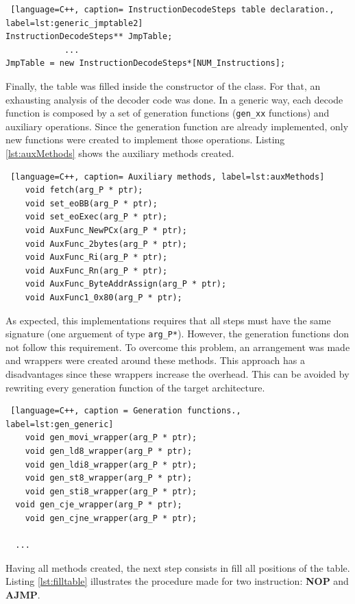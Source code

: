 \documentclass[12pt]{article}
\begin{document}
{\begin{lstlisting} [language=C++, caption= InstructionDecodeSteps table declaration., label=lst:generic_jmptable2]
InstructionDecodeSteps** JmpTable;
			...
JmpTable = new InstructionDecodeSteps*[NUM_Instructions];	
\end{lstlisting}

Finally, the table was filled inside the constructor of the class. For that, an exhausting analysis of the decoder code was done. In a generic way, each decode function is composed by a set of generation functions (\texttt{gen\_xx} functions) and auxiliary operations. Since the generation function are already implemented, only new functions were created to implement those operations. Listing \ref{lst:auxMethods} shows the auxiliary methods created.    

\begin{lstlisting} [language=C++, caption= Auxiliary methods, label=lst:auxMethods]
	void fetch(arg_P * ptr);
	void set_eoBB(arg_P * ptr);
	void set_eoExec(arg_P * ptr);
	void AuxFunc_NewPCx(arg_P * ptr);
	void AuxFunc_2bytes(arg_P * ptr);
	void AuxFunc_Ri(arg_P * ptr);
	void AuxFunc_Rn(arg_P * ptr);
	void AuxFunc_ByteAddrAssign(arg_P * ptr);
	void AuxFunc1_0x80(arg_P * ptr);
\end{lstlisting}

As expected, this implementations requires that all steps must have the same signature (one arguement of type \texttt{arg\_P*}). However, the generation functions don not follow this requirement. To overcome this problem, an arrangement was made and wrappers were created around these methods. This approach has a disadvantages since these wrappers increase the overhead. This can be avoided by rewriting every generation function of the target architecture.

\begin{lstlisting} [language=C++, caption = Generation functions., label=lst:gen_generic]
	void gen_movi_wrapper(arg_P * ptr);
	void gen_ld8_wrapper(arg_P * ptr);
	void gen_ldi8_wrapper(arg_P * ptr);
	void gen_st8_wrapper(arg_P * ptr);
	void gen_sti8_wrapper(arg_P * ptr);
  void gen_cje_wrapper(arg_P * ptr);
	void gen_cjne_wrapper(arg_P * ptr);
  
  ...
\end{lstlisting}

Having all methods created, the next step consists in fill all positions of the table. Listing \ref{lst:filltable} illustrates the procedure made for two instruction: \textbf{NOP} and \textbf{AJMP}.

}
\end{document}
